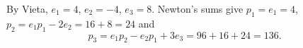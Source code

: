 By Vieta, $e_1=4$, $e_2=-4$, $e_3=8$. Newton's sums give $p_1=e_1=4$, $p_2=e_1p_1-2e_2=16+8=24$ and
\[
p_3=e_1p_2-e_2p_1+3e_3=96+16+24=\boxed{136}.
\]
